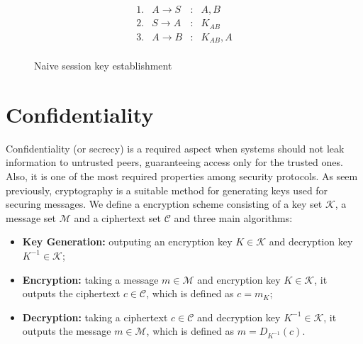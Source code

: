 \begin{figure}[ht]
  \centering
  \[
    \begin{array}{rlcl}
      1. & A \longrightarrow S & : & A, B \\
      2. & S \longrightarrow A & : & K_{AB} \\
      3. & A \longrightarrow B & : & K_{AB}, A \\
    \end{array}
  \]
  \caption{Naive session key establishment}
  \label{prt:naive-session-key}
\end{figure}





















\section{Confidentiality}
Confidentiality (or secrecy) is a required aspect when systems should not leak information to untrusted peers, guaranteeing access only for the trusted ones. Also, it is one of the most required properties among security protocols. As seem previously, cryptography is a suitable method for generating keys used for securing messages. We define a encryption scheme consisting of a key set $\mathcal{K}$, a message set $\mathcal{M}$ and a ciphertext set $\mathcal{C}$ and three main algorithms:

\begin{itemize}
  \item \textbf{Key Generation:} outputing an encryption key $K \in \mathcal{K}$ and decryption key $K^{-1} \in \mathcal{K}$;

  \item \textbf{Encryption:} taking a message $m \in \mathcal{M}$ and encryption key $K \in \mathcal{K}$, it outputs the ciphertext $c \in \mathcal{C}$, which is defined as $c = m_K$;

  \item \textbf{Decryption:} taking a ciphertext $c \in \mathcal{C}$ and decryption key $K^{-1} \in \mathcal{K}$, it outputs the message $m \in \mathcal{M}$, which is defined as $m = D_{K^{-1}}(c)$.
\end{itemize}

